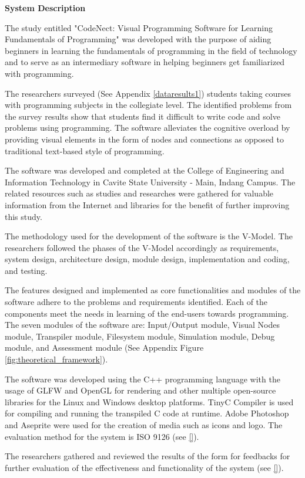 \flushleft
\textbf{System Description}
\justifying

\parx
The study entitled "CodeNect: Visual Programming Software for Learning
Fundamentals of Programming" was developed with the purpose of aiding beginners
in learning the fundamentals of programming in the field of technology and to serve
as an intermediary software in helping beginners get familiarized with programming.

\parx
The researchers surveyed (See Appendix \ref{dataresults1}) students taking
courses with programming subjects in the collegiate level. The identified
problems from the survey results show that students find it difficult to write
code and solve problems using programming. The software alleviates the
cognitive overload by providing visual elements in the form of nodes and
connections as opposed to traditional text-based style of programming.

\parx
The software was developed and completed at the College of Engineering and
Information Technology in Cavite State University - Main, Indang Campus. The
related resources such as studies and researches were gathered for valuable
information from the Internet and libraries for the benefit of further improving
this study.

\parx
The methodology used for the development of the software is the V-Model. The
researchers followed the phases of the V-Model accordingly as requirements,
system design, architecture design, module design, implementation and coding,
and testing.

\parx
The features designed and implemented as core functionalities and modules of the
software adhere to the problems and requirements identified. Each of the components
meet the needs in learning of the end-users towards programming. The seven modules
of the software are: Input/Output module, Visual Nodes module, Transpiler module,
Filesystem module, Simulation module, Debug module, and Assessment module
(See Appendix Figure \ref{fig:theoretical_framework}).

\parx
The software was developed using the C++ programming language with the usage of
GLFW and OpenGL for rendering and other multiple open-source libraries for the
Linux and Windows desktop platforms. TinyC Compiler is used for compiling and
running the transpiled C code at runtime. Adobe Photoshop and Aseprite were
used for the creation of media such as icons and logo. The evaluation method
for the system is ISO 9126 (see \ref{}).

\parx
The researchers gathered and reviewed the results of the form for feedbacks for
further evaluation of the effectiveness and functionality of the system (see \ref{}).
